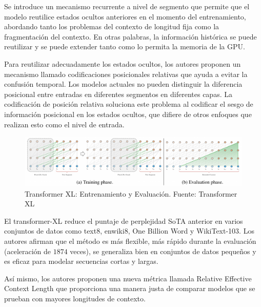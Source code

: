 \documentclass[conference]{IEEEtran}
\begin{document}
\vspace{0.2cm}

Se introduce un mecanismo recurrente a nivel de segmento que permite que el modelo reutilice estados ocultos anteriores en el momento del entrenamiento, abordando tanto los problemas del contexto de longitud fija como la fragmentaci\'on del contexto. En otras palabras, la informaci\'on hist\'orica se puede reutilizar y se puede extender tanto como lo permita la memoria de la GPU.
	
\vspace{0.2cm}

Para reutilizar adecuadamente los estados ocultos, los autores proponen un mecanismo llamado codificaciones posicionales relativas  que ayuda a evitar la confusi\'on temporal. Los modelos actuales no pueden distinguir la diferencia posicional entre entradas en diferentes segmentos en diferentes capas. La codificaci\'on de posici\'on relativa soluciona este problema al codificar el sesgo de informaci\'on posicional en los estados ocultos, que difiere de otros enfoques que realizan esto como el nivel de entrada.

\begin{figure}[h]
\includegraphics[scale=0.25]{imagenes/TransformerXL1.png} 
\caption{Transformer XL: Entrenamiento y Evaluación. Fuente: Transformer XL \cite{b7}}
\end{figure}


\vspace{0.2cm}


El transformer-XL reduce el puntaje de perplejidad SoTA anterior en varios conjuntos de datos como text8, enwiki8, One Billion Word y WikiText-103. Los autores afirman que el m\'etodo es m\'as flexible, m\'as r\'apido durante la evaluaci\'on (aceleraci\'on de $1874$ veces), se generaliza bien en conjuntos de datos peque\~nos y es eficaz para modelar secuencias cortas y largas.

\vspace{0.2cm}

As\'i mismo, los autores proponen una nueva m\'etrica llamada Relative Effective Context Length que proporciona una manera justa de comparar modelos que se prueban con mayores longitudes de contexto.
\end{document}
